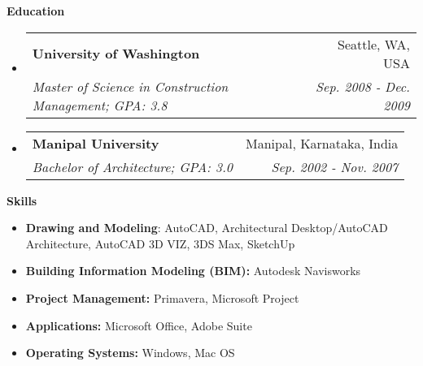 \documentclass[letterpaper,10pt]{article}
\makeatletter
\newcommand{\resitem}[1]{\item #1}
\newcommand{\resheading}[1]{{\large \colorbox{mygrey}{\vspace{0.6in} \begin{minipage}{\textwidth}{\textbf{#1 \vphantom{p\^{E}}}}\end{minipage}}}}
\newcommand{\ressubheading}[4]{
\begin{tabular*}{7in}{l@{\extracolsep{\fill}}r}
		\textbf{#1} & #2 \\
		\textit{#3} & \textit{#4} \\
\end{tabular*}}
\makeatother
\begin{document}
    
\resheading{Education}
\begin{itemize}
\item
  \ressubheading{University of Washington}{Seattle, WA, USA}{Master of Science in Construction Management; GPA: 3.8}{Sep. 2008 - Dec. 2009}
\item
  \ressubheading{Manipal University}{Manipal, Karnataka, India}{Bachelor of Architecture; GPA: 3.0}{Sep. 2002 - Nov. 2007}
\end{itemize}

\resheading{Skills}
\begin{itemize}
  \resitem{\textbf{Drawing and Modeling}: AutoCAD, Architectural Desktop/AutoCAD Architecture, AutoCAD 3D VIZ, 3DS Max, SketchUp}
  \resitem{\textbf{Building Information Modeling (BIM):} Autodesk Navisworks}
  \resitem{\textbf{Project Management:} Primavera, Microsoft Project}
  \resitem{\textbf{Applications:} Microsoft Office, Adobe Suite}
  \resitem{\textbf{Operating Systems:} Windows, Mac OS}
\end{itemize}
    
\end{document}
